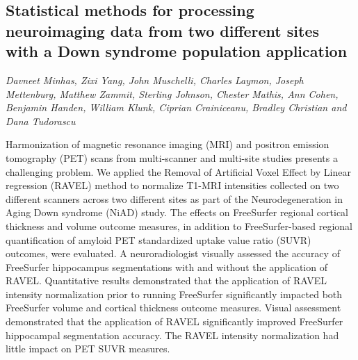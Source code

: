 \documentclass[../booklet.tex]{subfiles}
\begin{document}
\subsection[Statistical methods for processing neuroimaging data from two different sites with a Down syndrome population application. {\it Davneet Minhas, Zixi Yang, John Muschelli, Charles Laymon, Joseph Mettenburg, Matthew Zammit, Sterling Johnson, Chester Mathis, Ann Cohen, Benjamin Handen, William Klunk, Ciprian Crainiceanu, Bradley Christian and Dana Tudorascu}]{Statistical methods for processing neuroimaging data from two different sites with a Down syndrome population application}
             

\begin{center}
  {\it Davneet Minhas, Zixi Yang, John Muschelli, Charles Laymon, Joseph Mettenburg, Matthew Zammit, Sterling Johnson, Chester Mathis, Ann Cohen, Benjamin Handen, William Klunk, Ciprian Crainiceanu, Bradley Christian and Dana Tudorascu}
\end{center}


Harmonization of magnetic resonance imaging (MRI) and positron emission tomography (PET) scans from multi-scanner and multi-site studies presents a challenging problem. We applied the Removal of Artificial Voxel Effect by Linear regression (RAVEL) method to normalize T1-MRI intensities collected on two different scanners across two different sites as part of the Neurodegeneration in Aging Down syndrome (NiAD) study. The effects on FreeSurfer regional cortical thickness and volume outcome measures, in addition to FreeSurfer-based regional quantification of amyloid PET standardized uptake value ratio (SUVR) outcomes, were evaluated. A neuroradiologist visually assessed the accuracy of FreeSurfer hippocampus segmentations with and without the application of RAVEL. Quantitative results demonstrated that the application of RAVEL intensity normalization prior to running FreeSurfer significantly impacted both FreeSurfer volume and cortical thickness outcome measures. Visual assessment demonstrated that the application of RAVEL significantly improved FreeSurfer hippocampal segmentation accuracy. The RAVEL intensity normalization had little impact on PET SUVR measures.

\end{document}
